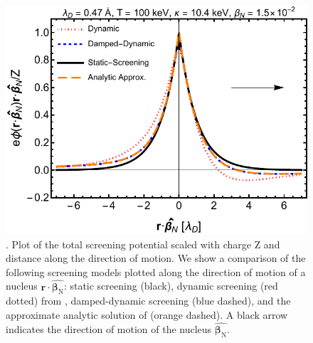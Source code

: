 \begin{figure}[h!]
 \centering
 \includegraphics[width=.95\linewidth]{plots/chap03BBN/phidat_100_1_1_0_full_lin.pdf}
 \caption{  . Plot of the total screening potential scaled with charge Z and distance along the direction of motion. We show a comparison of the following screening models plotted along the direction of motion of a nucleus $\boldsymbol{r}\cdot\hat{\boldsymbol{\beta}_{\text{N}}}$: static screening (black), dynamic screening (red dotted) from \cite{Hwang:2021kno}, damped-dynamic screening (blue dashed), and the approximate analytic solution of  (orange dashed). A black arrow indicates the direction of motion of the nucleus $\hat{\boldsymbol{\beta}_{\text{N}}}$. }
 \label{fig:dynamiclinear}
\end{figure} 

